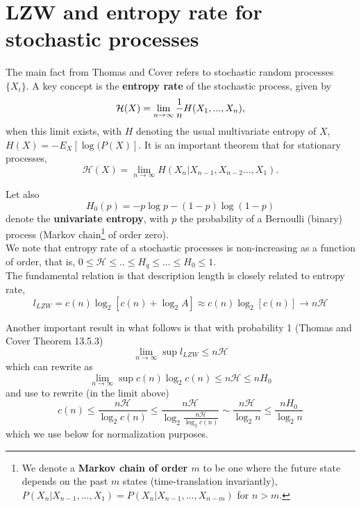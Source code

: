 \documentclass[11pt]{amsart}
\begin{document}

\section{LZW and entropy rate for stochastic processes}


The main fact from Thomas and Cover \cite{Cover:2006aa} refers to stochastic random processes $\{X_{i}\}$. A key concept is the {\bf entropy rate} of the stochastic process, given by  
 \begin{equation}
 \mathcal H(X)= \lim_{n\rightarrow \infty} {1\over n} H(X_1, ..., X_n), 
\end{equation}
when this limit exists, with $H$ denoting the usual multivariate entropy of $X$, $
H(X)=-E_{X}[\log(P(X)]
$.  It is an important theorem that for stationary processes, 
\begin{equation}
 \mathcal H(X)
= \lim_{n\rightarrow \infty} H(X_n|X_{n-1}, X_{n-2} ..., X_1).
\end{equation} 
\newline 

Let also  
$$H_{0}(p) = -p\log p -(1-p)\log (1-p)$$ 
denote the {\bf univariate entropy}, with $p$ the probability of a Bernoulli (binary) process (Markov chain\footnote{We denote a {\bf Markov chain of order $m$} to be one where the future state depends on the past $m$ states (time-translation invariantly), $P(X_{n}|X_{n-1}, ..., X_{1})= P(X_{n}|X_{n-1}, ..., X_{n-m})$ for $n>m$. } of order zero).  \\

We note that entropy rate of a stochastic processes is non-increasing as a function of order, that is, $0\leq \mathcal H \leq .. \leq H_{q} \leq ... \leq H_{0} \leq 1$.  \\


The fundamental relation is that description length is closely related to entropy rate, 
\begin{equation}
l_{LZW}= c(n) \log_{2} \left[ c(n)+ \log_{2} A \right] \approx c(n) \log_{2} \left[ c(n)\right] \longrightarrow {n}{\mathcal H} 
\end{equation}
\newline

Another important  result  in what follows is that with probability 1 (Thomas and Cover Theorem 13.5.3)
$$
\lim_{n\rightarrow \infty} \sup   l_{LZW} \leq n \mathcal H 
 $$ 
 which can rewrite as
 $$
 \lim_{n\rightarrow \infty} \sup   c(n) \log_{2} c(n) \leq  n \mathcal H  \leq n  H_{0}
 $$
 and use to rewrite (in the limit above)
\begin{equation}
 c(n)  \leq  \frac{n \mathcal H}{\log_{2} c(n) }  \leq \frac{n \mathcal H}{\log_{2} \frac{n \mathcal H}{\log_{2} c(n) }}  \sim \frac{n \mathcal H}{\log_{2} n } 
 \leq \frac{n  H_{0}}{\log_{2} n }  
 \end{equation}
 which we use below for normalization purposes.
\end{document}
